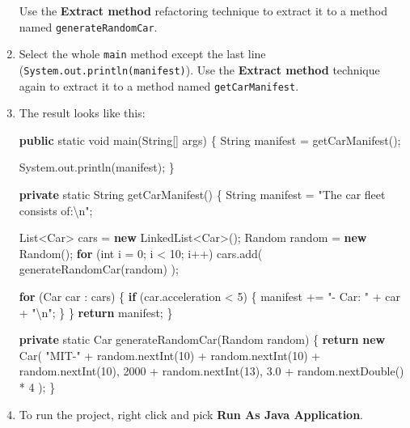 \documentclass[]{report}
\newenvironment{Shaded}{}{}
\newcommand{\KeywordTok}[1]{\textcolor[rgb]{0.00,0.44,0.13}{\textbf{{#1}}}}
\newcommand{\DataTypeTok}[1]{\textcolor[rgb]{0.56,0.13,0.00}{{#1}}}
\newcommand{\DecValTok}[1]{\textcolor[rgb]{0.25,0.63,0.44}{{#1}}}
\newcommand{\FloatTok}[1]{\textcolor[rgb]{0.25,0.63,0.44}{{#1}}}
\newcommand{\CharTok}[1]{\textcolor[rgb]{0.25,0.44,0.63}{{#1}}}
\newcommand{\StringTok}[1]{\textcolor[rgb]{0.25,0.44,0.63}{{#1}}}
\newcommand{\FunctionTok}[1]{\textcolor[rgb]{0.02,0.16,0.49}{{#1}}}
\newcommand{\NormalTok}[1]{{#1}}
\begin{document}
\begin{enumerate}
  Use the \textbf{Extract method} refactoring technique to extract it to
  a method named \texttt{generateRandomCar}.
\item
  Select the whole \texttt{main} method except the last line
  (\texttt{System.out.println(manifest)}). Use the \textbf{Extract
  method} technique again to extract it to a method named
  \texttt{getCarManifest}.
\item
  The result looks like this:

\begin{Shaded}
\begin{Highlighting}[]
\KeywordTok{public} \DataTypeTok{static} \DataTypeTok{void} \FunctionTok{main}\NormalTok{(String[] args) \{}
  \NormalTok{String manifest = }\FunctionTok{getCarManifest}\NormalTok{();}

  \NormalTok{System.}\FunctionTok{out}\NormalTok{.}\FunctionTok{println}\NormalTok{(manifest);}
\NormalTok{\}}

\KeywordTok{private} \DataTypeTok{static} \NormalTok{String }\FunctionTok{getCarManifest}\NormalTok{() \{}
  \NormalTok{String manifest = }\StringTok{"The car fleet consists of:}\CharTok{\textbackslash{}n}\StringTok{"}\NormalTok{;}

  \NormalTok{List<Car> cars = }\KeywordTok{new} \NormalTok{LinkedList<Car>();}
  \NormalTok{Random random = }\KeywordTok{new} \NormalTok{Random();}
  \KeywordTok{for} \NormalTok{(}\DataTypeTok{int} \NormalTok{i = }\DecValTok{0}\NormalTok{; i < }\DecValTok{10}\NormalTok{; i++)}
    \NormalTok{cars.}\FunctionTok{add}\NormalTok{(}
      \FunctionTok{generateRandomCar}\NormalTok{(random)}
    \NormalTok{);}

  \KeywordTok{for} \NormalTok{(Car car : cars) \{}
    \KeywordTok{if} \NormalTok{(car.}\FunctionTok{acceleration} \NormalTok{< }\DecValTok{5}\NormalTok{) \{}
      \NormalTok{manifest += }\StringTok{"- Car: "} \NormalTok{+ car + }\StringTok{"}\CharTok{\textbackslash{}n}\StringTok{"}\NormalTok{;}
    \NormalTok{\}}
  \NormalTok{\}}
  \KeywordTok{return} \NormalTok{manifest;}
\NormalTok{\}}

\KeywordTok{private} \DataTypeTok{static} \NormalTok{Car }\FunctionTok{generateRandomCar}\NormalTok{(Random random) \{}
  \KeywordTok{return} \KeywordTok{new} \FunctionTok{Car}\NormalTok{(}
    \StringTok{"MIT-"} \NormalTok{+ random.}\FunctionTok{nextInt}\NormalTok{(}\DecValTok{10}\NormalTok{) + }
         \NormalTok{random.}\FunctionTok{nextInt}\NormalTok{(}\DecValTok{10}\NormalTok{) + }
         \NormalTok{random.}\FunctionTok{nextInt}\NormalTok{(}\DecValTok{10}\NormalTok{), }
    \DecValTok{2000} \NormalTok{+ random.}\FunctionTok{nextInt}\NormalTok{(}\DecValTok{13}\NormalTok{),}
    \FloatTok{3.0} \NormalTok{+ random.}\FunctionTok{nextDouble}\NormalTok{() * }\DecValTok{4}
  \NormalTok{);}
\NormalTok{\}}
\end{Highlighting}
\end{Shaded}
\item
  To run the project, right click and pick \textbf{Run As \textbar{}
  Java Application}.
\end{enumerate}
\end{document}
